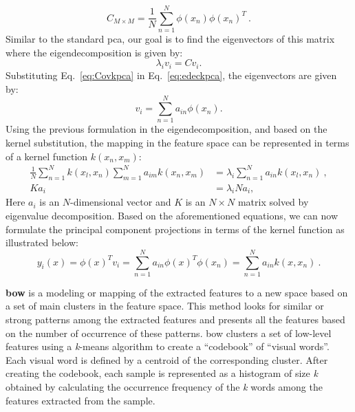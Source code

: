 \begin{description}
\begin{equation}
C_{M \times M} = \frac{1}{N}\sum\limits_{n=1}^{N} \phi(x_{n})\phi(x_{n})^{T}~.
\label{eq:Covkpca}
\end{equation}
Similar to the standard \ac{pca}, our goal is to find the eigenvectors of this matrix where the eigendecomposition is given by: 
\begin{equation}
\lambda_{i} v_{i} = C v_{i}.
\label{eq:edeckpca}
\end{equation}
Substituting Eq.~\ref{eq:Covkpca} in Eq.~\ref{eq:edeckpca}, the eigenvectors are given by: 
\begin{equation}
v_{i} = \sum_{n=1}^{N} a_{in}\phi(x_{n}).
\end{equation}
Using the previous formulation in the eigendecomposition, and based on the kernel substitution, the mapping in the feature space can be represented in terms of a kernel function $k(x_{n}, x_{m})$: 
\begin{subequations}
\begin{align}
\frac{1}{N}\sum\limits_{n=1}^{N} k(x_{l}, x_{n}) \sum\limits_{m=1}^{N} a_{im}k(x_{n}, x_{m}) & = \lambda_{i} \sum\limits_{n=1}^{N} a_{in}k(x_{l}, x_{n})~,\\
K a_{i} & = \lambda_{i}N a_{i},
\end{align}
\end{subequations} 
\noindent Here $a_{i}$ is an $N$-dimensional vector and $K$ is an $N \times N$ matrix solved by eigenvalue decomposition.
Based on the aforementioned equations, we can now formulate the principal component projections in terms of the kernel function as illustrated below: 
\begin{equation}
y_{i}(x) = \phi(x)^{T}v_{i} = \sum\limits_{n =1}^{N} a_{in}\phi(x)^{T}\phi(x_{n}) = \sum\limits_{n=1}^{N} a_{in}k(x,x_{n})~.
\end{equation} 


\item \textbf{\acf{bow}} is a modeling or mapping of the extracted features to a new space based on a set of main clusters in the feature space. 
This method looks for similar or strong patterns among the extracted features and presents all the features based on the number of occurrence of these patterns. 
\Ac{bow} clusters a set of low-level features using a \textit{k}-means algorithm to create a ``codebook'' of ``visual words''.
Each visual word is defined by a centroid of the corresponding cluster. 
After creating the codebook, each sample is represented as a histogram of size \textit{k} obtained by calculating the occurrence frequency of the \textit{k} words among the features extracted from the sample.


\end{description}
